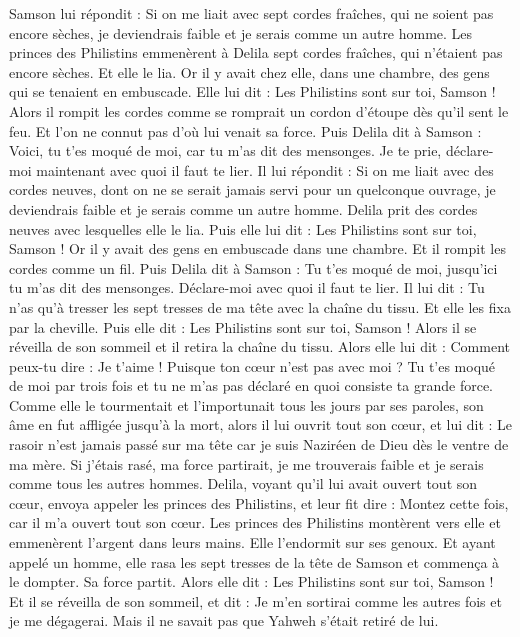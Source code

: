 \begin{multicols}{2}
Samson lui répondit : Si on me liait avec sept cordes fraîches, qui ne soient pas encore sèches, je deviendrais faible et je serais comme un autre homme.
Les princes des Philistins emmenèrent à Delila sept cordes fraîches, qui n'étaient pas encore sèches. Et elle le lia.
Or il y avait chez elle, dans une chambre, des gens qui se tenaient en embuscade. Elle lui dit : Les Philistins sont sur toi, Samson ! Alors il rompit les cordes comme se romprait un cordon d'étoupe dès qu'il sent le feu. Et l'on ne connut pas d'où lui venait sa force.
Puis Delila dit à Samson : Voici, tu t'es moqué de moi, car tu m'as dit des mensonges. Je te prie, déclare-moi maintenant avec quoi il faut te lier.
Il lui répondit : Si on me liait avec des cordes neuves, dont on ne se serait jamais servi pour un quelconque ouvrage, je deviendrais faible et je serais comme un autre homme.
Delila prit des cordes neuves avec lesquelles elle le lia. Puis elle lui dit : Les Philistins sont sur toi, Samson ! Or il y avait des gens en embuscade dans une chambre. Et il rompit les cordes comme un fil.
Puis Delila dit à Samson : Tu t'es moqué de moi, jusqu'ici tu m'as dit des mensonges. Déclare-moi avec quoi il faut te lier. Il lui dit : Tu n'as qu'à tresser les sept tresses de ma tête avec la chaîne du tissu.
Et elle les fixa par la cheville. Puis elle dit : Les Philistins sont sur toi, Samson ! Alors il se réveilla de son sommeil et il retira la chaîne du tissu.
Alors elle lui dit : Comment peux-tu dire : Je t'aime ! Puisque ton cœur n'est pas avec moi ? Tu t'es moqué de moi par trois fois et tu ne m'as pas déclaré en quoi consiste ta grande force.
Comme elle le tourmentait et l'importunait tous les jours par ses paroles, son âme en fut affligée jusqu'à la mort,
alors il lui ouvrit tout son cœur, et lui dit : Le rasoir n'est jamais passé sur ma tête car je suis Naziréen de Dieu dès le ventre de ma mère. Si j'étais rasé, ma force partirait, je me trouverais faible et je serais comme tous les autres hommes.
Delila, voyant qu'il lui avait ouvert tout son cœur, envoya appeler les princes des Philistins, et leur fit dire : Montez cette fois, car il m'a ouvert tout son cœur. Les princes des Philistins montèrent vers elle et emmenèrent l'argent dans leurs mains.
Elle l'endormit sur ses genoux. Et ayant appelé un homme, elle rasa les sept tresses de la tête de Samson et commença à le dompter. Sa force partit.
Alors elle dit : Les Philistins sont sur toi, Samson ! Et il se réveilla de son sommeil, et dit : Je m'en sortirai comme les autres fois et je me dégagerai. Mais il ne savait pas que Yahweh s'était retiré de lui.

\end{multicols}
